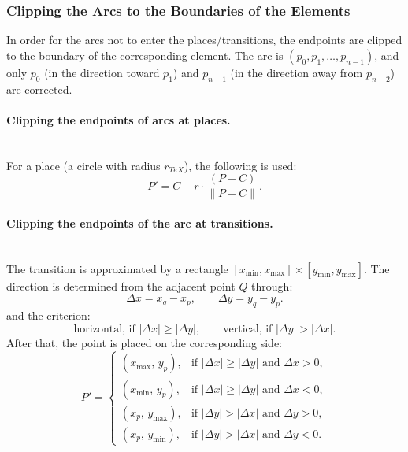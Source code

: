 \subsubsection{Clipping the Arcs to the Boundaries of the Elements}
\hspace*{2.5em}In order for the arcs not to enter the places/transitions, the endpoints are clipped to the boundary of the corresponding element. The arc is \((p_0, p_1, \dots, p_{n-1})\), and only \(p_0\) (in the direction toward \(p_1\)) and \(p_{n-1}\) (in the direction away from \(p_{n-2}\)) are corrected.

\paragraph{Clipping the endpoints of arcs at places.}
\mbox{}\\
For a place (a circle with radius \(r_{\textit{TeX}}\)), the following is used:
\begin{equation}
	P' = C + r \cdot \frac{(P - C)}{\lVert P - C \rVert}.
	\label{eq:clip-circle}
\end{equation}

\paragraph{Clipping the endpoints of the arc at transitions.}
\mbox{}\\
The transition is approximated by a rectangle \([x_{\min},x_{\max}] \times [y_{\min},y_{\max}]\). The direction is determined from the adjacent point \(Q\) through:
\begin{equation}
	\Delta x = x_q - x_p,\qquad \Delta y = y_q - y_p.
	\label{eq:deltas}
\end{equation}
and the criterion:
\begin{equation}
	\text{horizontal, if } |\Delta x| \ge |\Delta y|,\qquad
	\text{vertical, if } |\Delta y| > |\Delta x|.
	\label{eq:dominant-dir}
\end{equation}
After that, the point is placed on the corresponding side:
\begin{equation}
	P'=
	\begin{cases}
		(x_{\max},\,y_p), & \text{if } |\Delta x|\ge|\Delta y| \text{ and } \Delta x>0,\\
		(x_{\min},\,y_p), & \text{if } |\Delta x|\ge|\Delta y| \text{ and } \Delta x<0,\\
		(x_p,\,y_{\max}), & \text{if } |\Delta y|>|\Delta x| \text{ and } \Delta y>0,\\
		(x_p,\,y_{\min}), & \text{if } |\Delta y|>|\Delta x| \text{ and } \Delta y<0.
	\end{cases}
	\label{eq:rect-clip}
\end{equation}

